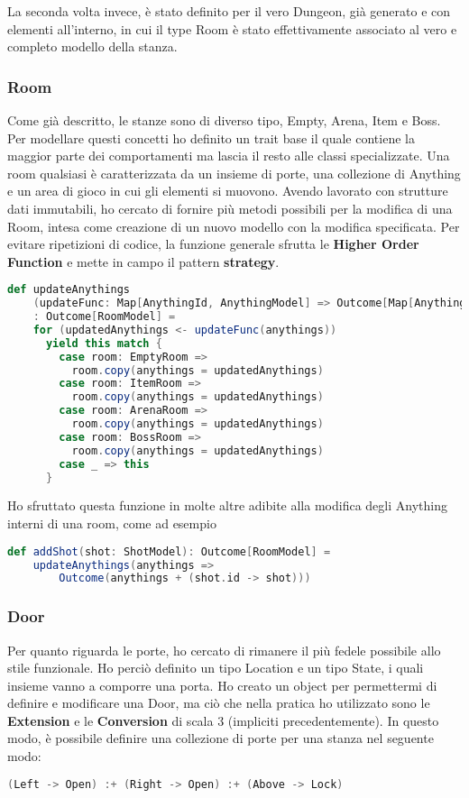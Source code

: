 La seconda volta invece, è stato definito per il vero Dungeon, già generato e con elementi all'interno, in cui il type Room è stato effettivamente associato al vero e completo modello della stanza.

\subsubsection{Room}
Come già descritto, le stanze sono di diverso tipo, Empty, Arena, Item e Boss. Per modellare questi concetti ho definito un trait base il quale contiene la maggior parte dei comportamenti ma lascia il resto alle classi specializzate. 
Una room qualsiasi è caratterizzata da un insieme di porte, una collezione di Anything e un area di gioco in cui gli elementi si muovono. 
Avendo lavorato con strutture dati immutabili, ho cercato di fornire più metodi possibili per la modifica di una Room, intesa come creazione di un nuovo modello con la modifica specificata. Per evitare ripetizioni di codice, la funzione generale sfrutta le \textbf{Higher Order Function} e mette in campo il pattern \textbf{strategy}. 
\begin{lstlisting}[language=Scala]
    def updateAnythings
    (updateFunc: Map[AnythingId, AnythingModel] => Outcome[Map[AnythingId, AnythingModel]])
    : Outcome[RoomModel] =
    for (updatedAnythings <- updateFunc(anythings))
      yield this match {
        case room: EmptyRoom =>
          room.copy(anythings = updatedAnythings)
        case room: ItemRoom =>
          room.copy(anythings = updatedAnythings)
        case room: ArenaRoom =>
          room.copy(anythings = updatedAnythings)
        case room: BossRoom =>
          room.copy(anythings = updatedAnythings)
        case _ => this
      }
\end{lstlisting}

Ho sfruttato questa funzione in molte altre adibite alla modifica degli Anything interni di una room, come ad esempio 
\begin{lstlisting}[language=Scala]
  def addShot(shot: ShotModel): Outcome[RoomModel] =
    updateAnythings(anythings => 
        Outcome(anythings + (shot.id -> shot)))
\end{lstlisting}

\subsubsection{Door}
Per quanto riguarda le porte, ho cercato di rimanere il più fedele possibile allo stile funzionale. Ho perciò definito un tipo Location e un tipo State, i quali insieme vanno a comporre una porta.
Ho creato un object per permettermi di definire e modificare una Door, ma ciò che nella pratica ho utilizzato sono le \textbf{Extension} e le \textbf{Conversion} di scala 3 (impliciti precedentemente).
In questo modo, è possibile definire una collezione di porte per una stanza nel seguente modo: 
\begin{lstlisting}[language=Scala]
    (Left -> Open) :+ (Right -> Open) :+ (Above -> Lock)
\end{lstlisting}

